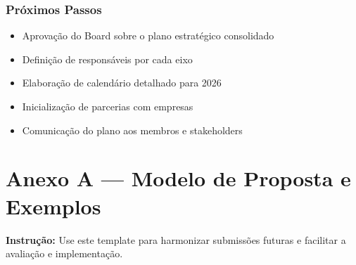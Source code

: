 \documentclass[12pt,a4paper]{article}
\begin{document}
\subsubsection*{Próximos Passos}
\begin{itemize}
    \item[$\checkmark$] Aprovação do Board sobre o plano estratégico consolidado
    \item[$\checkmark$] Definição de responsáveis por cada eixo
    \item[$\checkmark$] Elaboração de calendário detalhado para 2026
    \item[$\checkmark$] Inicialização de parcerias com empresas
    \item[$\checkmark$] Comunicação do plano aos membros e stakeholders
\end{itemize}

\vspace{1cm}


\newpage
\section*{Anexo A — Modelo de Proposta e Exemplos}

\begin{infobox}
\small\textbf{Instrução:} Use este template para harmonizar submissões futuras e facilitar a avaliação e implementação.
\end{infobox}
\end{document}
